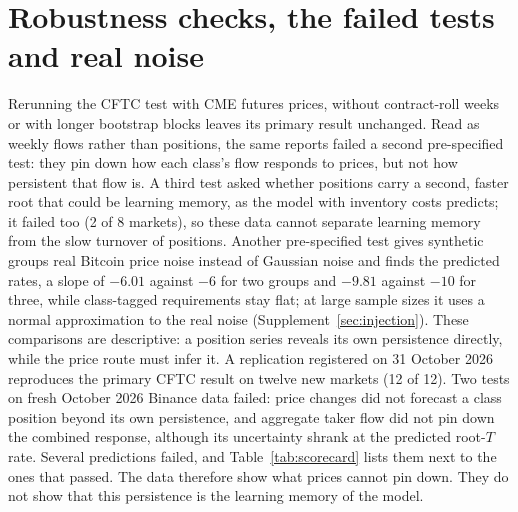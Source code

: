 \documentclass[12pt]{article}
\theoremstyle{definition}
\theoremstyle{remark}
\begin{document}
\section{Robustness checks, the failed tests and real noise}\label{app:introrobust} Rerunning the CFTC test with CME futures prices, without contract-roll weeks or with longer bootstrap blocks leaves its primary result unchanged. Read as weekly flows rather than positions, the same reports failed a second pre-specified test: they pin down how each class's flow responds to prices, but not how persistent that flow is. A third test asked whether positions carry a second, faster root that could be learning memory, as the model with inventory costs predicts; it failed too (2 of 8 markets), so these data cannot separate learning memory from the slow turnover of positions. Another pre-specified test gives synthetic groups real Bitcoin price noise instead of Gaussian noise and finds the predicted rates, a slope of $-6.01$ against $-6$ for two groups and $-9.81$ against $-10$ for three, while class-tagged requirements stay flat; at large sample sizes it uses a normal approximation to the real noise (Supplement~\ref{sec:injection}). These comparisons are descriptive: a position series reveals its own persistence directly, while the price route must infer it. A replication registered on 31 October 2026 reproduces the primary CFTC result on twelve new markets (12 of 12). Two tests on fresh October 2026 Binance data failed: price changes did not forecast a class position beyond its own persistence, and aggregate taker flow did not pin down the combined response, although its uncertainty shrank at the predicted root-$T$ rate. Several predictions failed, and Table~\ref{tab:scorecard} lists them next to the ones that passed. The data therefore show what prices cannot pin down. They do not show that this persistence is the learning memory of the model.
\end{document}
